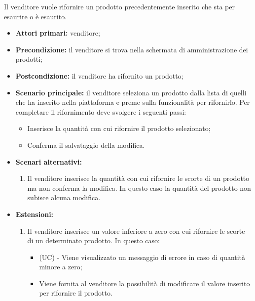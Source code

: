Il venditore vuole rifornire un prodotto precedentemente inserito che sta per esaurire o è esaurito.
\begin{itemize}
    \item \textbf{Attori primari:} venditore;
    \item \textbf{Precondizione:} il venditore si trova nella schermata di amministrazione dei prodotti;
    \item \textbf{Postcondizione:} il venditore ha rifornito un prodotto;
    \item \textbf{Scenario principale:} il venditore seleziona un prodotto dalla lista di quelli che ha inserito nella piattaforma e preme sulla funzionalità per rifornirlo. Per completare il rifornimento deve svolgere i seguenti passi:
    \begin{itemize}
        \item Inserisce la quantità con cui rifornire il prodotto selezionato;
        \item Conferma il salvataggio della modifica.
    \end{itemize}
	\item \textbf{Scenari alternativi:}
	\begin{enumerate}[label=\lett]
		\item Il venditore inserisce la quantità con cui rifornire le scorte di un prodotto ma non conferma la modifica. In questo caso la quantità del prodotto non subisce alcuna modifica.
	\end{enumerate}
	\item \textbf{Estensioni:}
	\begin{enumerate}[label=\lett]
		\item Il venditore inserisce un valore inferiore a zero con cui rifornire le scorte di un determinato prodotto. In questo caso:
		\begin{itemize}
			\item (UC) - Viene visualizzato un messaggio di errore in caso di quantità minore a zero;
			\item Viene fornita al venditore la possibilità di modificare il valore inserito per rifornire il prodotto.
		\end{itemize}
	\end{enumerate}
\end{itemize}

